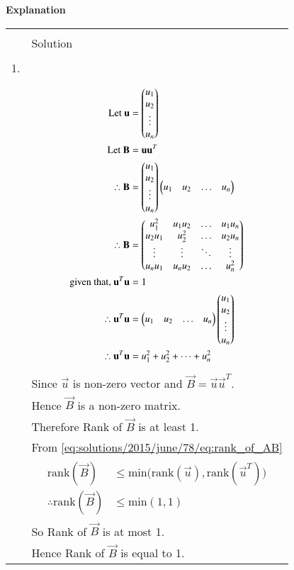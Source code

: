 {\textbf{Explanation}}
\onecolumn
\begin{longtable}{|l|l|}
\hline
\multirow{3}{*}{} & \\
Statement&Solution\\
\hline
&\\
1.&\\
&\parbox{10cm}{\begin{align*}
    \mbox{Let }\mathbf{u}&=\begin{pmatrix}u_1\\u_2\\\vdots\\u_n\end{pmatrix}\\
    \mbox{Let }\mathbf{B}&=\mathbf{u}\mathbf{u}^T\\
    \therefore \mathbf{B}&=\begin{pmatrix}u_1\\u_2\\\vdots\\u_n\end{pmatrix}\begin{pmatrix}u_1&u_2&\dots&u_n\end{pmatrix}\\
    \therefore \mathbf{B}&=\begin{pmatrix}u_1^2&u_1u_2&\dots&u_1u_n\\
    u_2u_1&u_2^2&\dots&u_2u_n\\
    \vdots&\vdots&\ddots&\vdots\\
    u_nu_1&u_nu_2&\dots&u_n^2\end{pmatrix}\\
    \mbox{given that, }\mathbf{u}^T\mathbf{u}&=1\\
    \therefore \mathbf{u}^T\mathbf{u}&=\begin{pmatrix}u_1&u_2&\dots&u_n\end{pmatrix}\begin{pmatrix}u_1\\u_2\\\vdots\\u_n\end{pmatrix}\\
    \therefore \mathbf{u}^T\mathbf{u}&=u_1^2+u_2^2+\dots+u_n^2
\end{align*}}\\
&Since $\vec{u}$ is non-zero vector and $\vec{B}=\vec{u}\vec{u}^T$.\\
&Hence $\vec{B}$ is a non-zero matrix.\\
&Therefore Rank of $\vec{B}$ is at least 1.\\
&From \eqref{eq:solutions/2015/june/78/eq:rank_of_AB}\\
&\parbox{8cm}{\begin{align*}
    \mbox{rank}(\vec{B})&\leq\mbox{min(rank}(\vec{u}),\mbox{rank}(\vec{u}^T))\\
    \therefore\mbox{rank}(\vec{B})&\leq\mbox{min}(1,1)
\end{align*}}\\
&So Rank of $\vec{B}$ is at most 1.\\
&Hence Rank of $\vec{B}$ is equal to 1.\\

\end{longtable}
